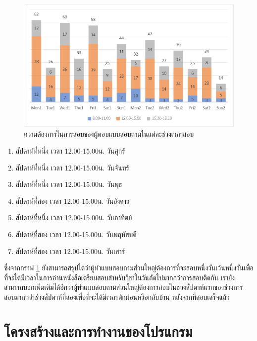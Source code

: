 \begin{figure}
  \begin{center}
    \includegraphics[width=\linewidth]{images/bar_chart_for_final_exam_slot.png}
  \end{center}
  \caption[Poem]{ความต้องการในการสอบของผู้ตอบแบบสอบถามในแต่ละช่วงเวลาสอบ}
  \label{fig:time_slot}     
\end{figure}
\begin{enumerate}
  \item สัปดาห์ที่หนึ่ง เวลา 12.00-15.00น. วันศุกร์ 
  \item สัปดาห์ที่หนึ่ง เวลา 12.00-15.00น. วันจันทร์
  \item สัปดาห์ที่หนึ่ง เวลา 12.00-15.00น. วันพุธ
  \item สัปดาห์ที่สอง เวลา 12.00-15.00น. วันอังคาร
  \item สัปดาห์ที่หนึ่ง เวลา 12.00-15.00น. วันอาทิตย์
  \item สัปดาห์ที่สอง เวลา 12.00-15.00น. วันพฤหัสบดี
  \item สัปดาห์ที่สอง เวลา 12.00-15.00น. วันเสาร์
\end{enumerate}

ซึ่งจากกราฟ \ref{fig:time_slot} ยังสามารถสรุปได้ว่าผู้ทำแบบสอบถามส่วนใหญ่ต้องการที่จะสอบหนึ่งวันเว้นหนึ่งวันเพื่อที่จะได้มีเวลาในการอ่านหนังสือเตรียมสอบสำหรับวิชาในวันถัดไปมากกว่าการสอบติดกัน 
เรายังสามารถบอกเพิ่มเติมได้อีกว่าผู้ทำแบบสอบถามส่วนใหญ่ต้องการสอบในช่วงสัปดาห์แรกของช่วงการสอบมากกว่าช่วงสัปดาห์ที่สองเพื่อที่จะได้มีเวลาพักผ่อนหรือกลับบ้าน หลังจากที่สอบเสร็จแล้ว

\section{โครงสร้างและการทำงานของโปรแกรม}
